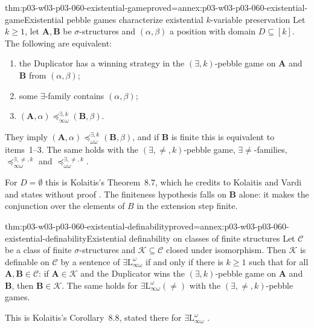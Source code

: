 \begin{hbtheorem}{thm:p03-w03-p03-060-existential-game}{proved=annex:p03-w03-p03-060-existential-game}{Existential pebble games characterize existential \(k\)-variable preservation}
Let \(k\ge1\), let \(\mathbf A,\mathbf B\) be \(\sigma\)-structures and
\((\alpha,\beta)\) a position with domain \(D\subseteq[k]\). The following
are equivalent:
\begin{enumerate}
\item the Duplicator has a winning strategy in the \((\exists,k)\)-pebble
      game on \(\mathbf A\) and \(\mathbf B\) from \((\alpha,\beta)\);
\item some \(\exists\)-family contains \((\alpha,\beta)\);
\item \((\mathbf A,\alpha)\preceq^{\exists,k}_{\infty\omega}(\mathbf B,\beta)\).
\end{enumerate}
They imply \((\mathbf A,\alpha)\preceq^{\exists,k}_{\omega\omega}(\mathbf B,\beta)\),
and if \(\mathbf B\) is finite this is equivalent to items~1--3. The same
holds with the \((\exists,\neq,k)\)-pebble game,
\(\exists{\neq}\)-families, \(\preceq^{\exists,\neq,k}_{\infty\omega}\) and
\(\preceq^{\exists,\neq,k}_{\omega\omega}\).
\end{hbtheorem}

For \(D=\emptyset\) this is Kolaitis's Theorem~8.7, which he credits to
Kolaitis and Vardi and states without proof
\cite[Thm.~8.7, p.~73]{Kolaitis2003ExpressivePowerNotes}. The
finiteness hypothesis falls on \(\mathbf B\) alone: it makes the
conjunction over the elements of \(B\) in the extension step finite.

\begin{hbcorollary}{thm:p03-w03-p03-060-existential-definability}{proved=annex:p03-w03-p03-060-existential-definability}{Existential definability on classes of finite structures}
Let \(\mathcal C\) be a class of finite \(\sigma\)-structures and
\(\mathcal K\subseteq\mathcal C\) closed under isomorphism. Then
\(\mathcal K\) is definable on \(\mathcal C\) by a sentence of
\(\exists\mathrm{L}^\omega_{\infty\omega}\) if and only if there is
\(k\ge1\) such that for all \(\mathbf A,\mathbf B\in\mathcal C\): if
\(\mathbf A\in\mathcal K\) and the Duplicator wins the
\((\exists,k)\)-pebble game on \(\mathbf A\) and \(\mathbf B\), then
\(\mathbf B\in\mathcal K\). The same holds for
\(\exists\mathrm{L}^\omega_{\infty\omega}(\neq)\) with the
\((\exists,\neq,k)\)-pebble games.
\end{hbcorollary}

This is Kolaitis's Corollary~8.8, stated there for
\(\exists\mathrm{L}^\omega_{\infty\omega}\) \cite[Cor.~8.8 and Method~8.9,
p.~73]{Kolaitis2003ExpressivePowerNotes}.

